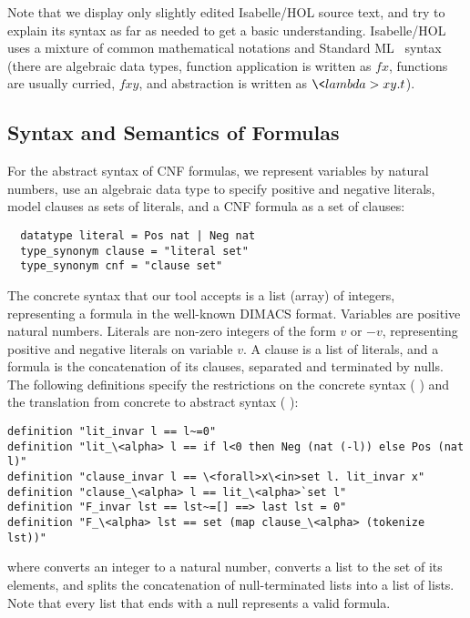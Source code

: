 \documentclass[smallcondensed]{svjour3}     %
\makeatletter
\newcommand{\isai}{\lstinline[language=isabelle,basicstyle=\normalsize\ttfamily\slshape]}
\renewcommand\lstinline[1][]{%
  \leavevmode
  \ifmmode\expandafter\hbox\fi\bgroup
    \def\lst@boxpos{b}%
    \lsthk@PreSet\lstset{flexiblecolumns,#1}%
    \lsthk@TextStyle
    \@ifnextchar\bgroup{\afterassignment\lst@InlineG \let\@let@token}%
                       \lstinline@}
\makeatother
\begin{document}
Note that we display only slightly edited Isabelle/HOL source text, and try to explain its syntax as far as needed to get a basic understanding.
Isabelle/HOL uses a mixture of common mathematical notations and Standard ML~\cite{MHMT97} syntax (\eg there are algebraic data types, function application is written as 
\isai$f x$, functions are usually curried, \eg \isai$f x y$, and abstraction is written as \isai$\<lambda>x y. t$).


\subsection{Syntax and Semantics of Formulas}\label{sec:syn_sem_frml}
For the abstract syntax of CNF formulas, we represent variables by natural numbers, use an algebraic data type to specify positive and negative literals, model clauses 
as sets of literals, and a CNF formula as a set of clauses:
\begin{lstlisting}
  datatype literal = Pos nat | Neg nat
  type_synonym clause = "literal set"
  type_synonym cnf = "clause set"
\end{lstlisting}

The concrete syntax that our tool accepts is a list (array) of integers, representing a formula in the well-known DIMACS format.
Variables are positive natural numbers. Literals are non-zero integers of the form $v$ or $-v$, representing positive and negative literals on variable $v$.
A clause is a list of literals, and a formula is the concatenation of its clauses, separated and terminated by nulls.
The following definitions specify the restrictions on the concrete syntax (\isai{xxx_invar}) and the translation from concrete to abstract syntax (\isai{xxx_\<alpha>}):
\begin{lstlisting}
definition "lit_invar l == l~=0"
definition "lit_\<alpha> l == if l<0 then Neg (nat (-l)) else Pos (nat l)"
definition "clause_invar l == \<forall>x\<in>set l. lit_invar x"
definition "clause_\<alpha> l == lit_\<alpha>`set l"
definition "F_invar lst == lst~=[] ==> last lst = 0"
definition "F_\<alpha> lst == set (map clause_\<alpha> (tokenize lst))"
\end{lstlisting}
where \isai{nat} converts an integer to a natural number, 
\isai{set} converts a list to the set of its elements, 
and \isai{tokenize l} splits the concatenation of null-terminated lists into a list of lists.
Note that every list that ends with a null represents a valid formula.
\end{document}
